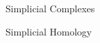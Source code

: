 \documentclass[../main.tex]{subfiles}
\begin{document}
    \begin{section}{Simplicial Complexes} 
            
    \end{section}
    \newpage
    \begin{section}{Simplicial Homology}
            
    \end{section}
\end{document}
